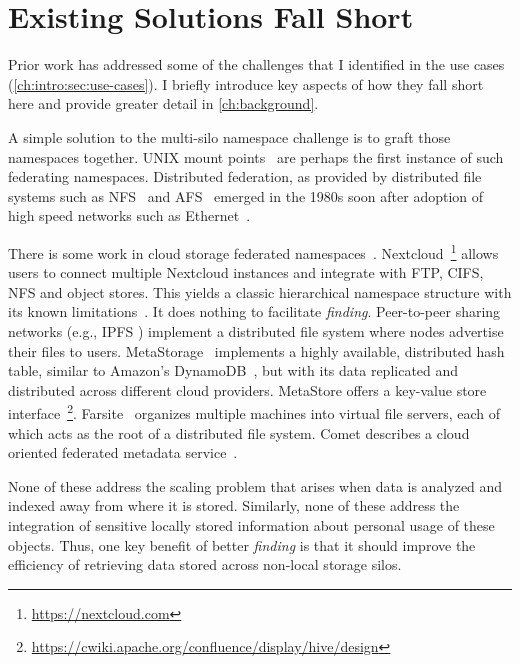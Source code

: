 \section{Existing Solutions Fall Short}
\label{ch:intro:sec:existing-solutions}

Prior work has addressed some of the challenges that I identified in the use
cases (\autoref{ch:intro:sec:use-cases}).  I briefly introduce key
aspects of how they fall short here and provide greater detail in
\autoref{ch:background}.

A simple solution to the multi-silo namespace challenge is to graft those
namespaces together. UNIX mount points~\cite{unix} are perhaps the first
instance of such federating namespaces. Distributed federation, as provided by
distributed file systems such as NFS~\cite{nfs} and AFS~\cite{howard1988scale}
emerged in the 1980s soon after adoption of high speed networks such as
Ethernet~\cite{digital1980ethernet}.

There is some work in cloud storage federated
namespaces~\cite{scfs,federatedMetaData}.
Nextcloud~\footnote{\url{https://nextcloud.com}} allows users to connect
multiple Nextcloud instances and integrate with FTP, CIFS, NFS and object
stores. This yields a classic hierarchical namespace structure with its known
limitations~\cite{vicente1987assaying,vicente1988accommodating}. It does nothing
to facilitate \emph{finding}. Peer-to-peer sharing networks (e.g., IPFS \cite{benet2014ipfs}) implement a
distributed file system where nodes advertise their files to users.
MetaStorage~\cite{metastorage} implements a highly available, distributed hash
table, similar to Amazon's DynamoDB~\cite{10.1145/2213836.2213945},
but with its data replicated and distributed across different cloud providers.
MetaStore offers a key-value store interface~\footnote{\url{https://cwiki.apache.org/confluence/display/hive/design}}.
Farsite~\cite{Adya:2003:Farsite} organizes multiple machines into virtual file
servers, each of which acts as the root of a distributed file system. Comet
describes a cloud oriented federated metadata service~\cite{federatedMetaData}.

None of these address the scaling problem that arises when data is analyzed and indexed
away from where it is stored.  Similarly, none of these address the integration
of sensitive locally stored information about personal usage of these objects.
Thus, one key benefit of better \emph{finding} is that
it should improve the efficiency of retrieving data stored across non-local
storage silos.

